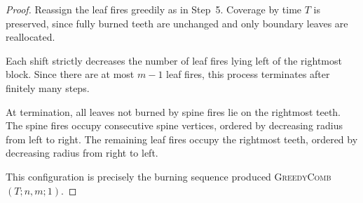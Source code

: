 \documentclass[10pt,a4paper]{amsart}
\begin{document}
\begin{proof}
Reassign the leaf fires greedily as in Step~5.
Coverage by time $T$ is preserved,
since fully burned teeth are unchanged
and only boundary leaves are reallocated. 

Each shift strictly decreases
the number of leaf fires lying left of the rightmost block.
Since there are at most $m-1$ leaf fires,
this process terminates after finitely many steps.

\medskip
At termination,
all leaves not burned by spine fires
lie on the rightmost teeth.
The spine fires occupy consecutive spine vertices,
ordered by decreasing radius from left to right.
The remaining leaf fires occupy the rightmost teeth,
ordered by decreasing radius from right to left.

This configuration is precisely the burning sequence produced
\textsc{GreedyComb}$(T;n,m;1)$.
\end{proof}
\end{document}
